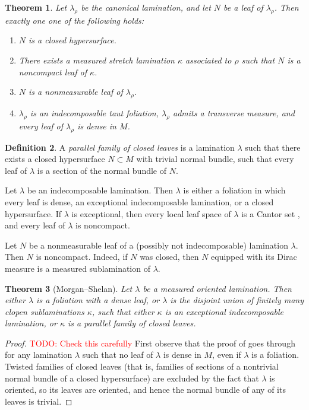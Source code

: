 \documentclass[reqno,11pt]{amsart}
\newcommand{\dfn}[1]{\emph{#1}\index{#1}}
\newtheorem{theorem}{Theorem}[section]
\theoremstyle{definition}
\newtheorem{definition}[theorem]{Definition}
\numberwithin{equation}{section}
\newcommand\todo[1]{\textcolor{red}{TODO: #1}}
\begin{document}
\begin{theorem}\label{classification of leaves}
Let $\lambda_\rho$ be the canonical lamination, and let $N$ be a leaf of $\lambda_\rho$.
Then exactly one one of the following holds:
\begin{enumerate}
\item $N$ is a closed hypersurface.
\item There exists a measured stretch lamination $\kappa$ associated to $\rho$ such that $N$ is a noncompact leaf of $\kappa$.
\item $N$ is a nonmeasurable leaf of $\lambda_\rho$.
\item $\lambda_\rho$ is an indecomposable taut foliation, $\lambda_\rho$ admits a transverse measure, and every leaf of $\lambda_\rho$ is dense in $M$.
\end{enumerate}
\end{theorem}

\begin{definition}
A \dfn{parallel family of closed leaves} is a lamination $\lambda$ such that there exists a closed hypersurface $N \subset M$ with trivial normal bundle, such that every leaf of $\lambda$ is a section of the normal bundle of $N$.
\end{definition}

Let $\lambda$ be an indecomposable lamination.
Then $\lambda$ is either a foliation in which every leaf is dense, an exceptional indecomposable lamination, or a closed hypersurface.
If $\lambda$ is exceptional, then every local leaf space of $\lambda$ is a Cantor set \cite[{\S}I.3.1]{Morgan88}, and every leaf of $\lambda$ is noncompact.

Let $N$ be a nonmeasurable leaf of a (possibly not indecomposable) lamination $\lambda$.
Then $N$ is noncompact.
Indeed, if $N$ was closed, then $N$ equipped with its Dirac measure is a measured sublamination of $\lambda$.

\begin{theorem}[Morgan--Shelan]\label{MorganShelan}
Let $\lambda$ be a measured oriented lamination.
Then either $\lambda$ is a foliation with a dense leaf, or $\lambda$ is the disjoint union of finitely many clopen sublaminations $\kappa$, such that either $\kappa$ is an exceptional indecomposable lamination, or $\kappa$ is a parallel family of closed leaves.
\end{theorem}
\begin{proof}
  \todo{Check this carefully}
First observe that the proof of \cite[Theorem I.3.2]{Morgan88} goes through for any lamination $\lambda$ such that no leaf of $\lambda$ is dense in $M$, even if $\lambda$ is a foliation.
Twisted families of closed leaves (that is, families of sections of a nontrivial normal bundle of a closed hypersurface) are excluded by the fact that $\lambda$ is oriented, so its leaves are oriented, and hence the normal bundle of any of its leaves is trivial.
\end{proof}
\end{document}

